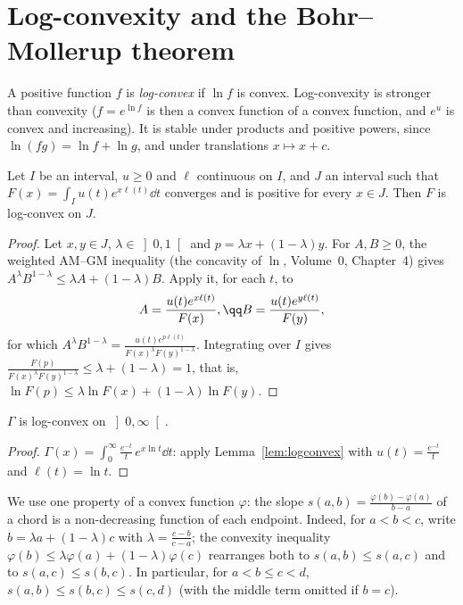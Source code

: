 \section{Log-convexity and the Bohr--Mollerup theorem}

A positive function $f$ is \emph{log-convex} if $\ln f$ is convex. Log-convexity is stronger than convexity
($f=e^{\ln f}$ is then a convex function of a convex function, and $e^u$ is convex and increasing). It is stable under
products and positive powers, since $\ln(fg)=\ln f+\ln g$, and under translations $x\mapsto x+c$.

\begin{lemma}\label{lem:logconvex}
Let $I$ be an interval, $u\ge0$ and $\ell$ continuous on $I$, and $J$ an interval such that $F(x)=\int_Iu(t)e^{x\ell(t)}\dd t$
converges and is positive for every $x\in J$. Then $F$ is log-convex on $J$.
\end{lemma}
\begin{proof}
Let $x,y\in J$, $\lambda\in\left]0,1\right[$ and $p=\lambda x+(1-\lambda)y$. For $A,B\ge0$, the weighted AM--GM inequality (the concavity
of $\ln$, Volume~0, Chapter~4) gives $A^\lambda B^{1-\lambda}\le\lambda A+(1-\lambda)B$. Apply it, for each $t$, to
\[
\begin{gathered}A=\frac{u(t)e^{x\ell(t)}}{F(x)},\qq B=\frac{u(t)e^{y\ell(t)}}{F(y)},\end{gathered}
\]
for which $A^\lambda B^{1-\lambda}=\frac{u(t)e^{p\ell(t)}}{F(x)^\lambda F(y)^{1-\lambda}}$. Integrating over $I$ gives
$\frac{F(p)}{F(x)^\lambda F(y)^{1-\lambda}}\le\lambda+(1-\lambda)=1$, that is, $\ln F(p)\le\lambda\ln F(x)+(1-\lambda)\ln F(y)$.
\end{proof}

\begin{corollary}\label{cor:gammalogconvex}
$\Gamma$ is log-convex on $\left]0,\infty\right[$.
\end{corollary}
\begin{proof}
$\Gamma(x)=\int_0^\infty\frac{e^{-t}}t\,e^{x\ln t}\dd t$: apply Lemma~\ref{lem:logconvex} with $u(t)=\frac{e^{-t}}t$ and $\ell(t)=\ln t$.
\end{proof}

We use one property of a convex function $\varphi$: the slope $s(a,b)=\frac{\varphi(b)-\varphi(a)}{b-a}$ of a chord is a non-decreasing
function of each endpoint. Indeed, for $a<b<c$, write $b=\lambda a+(1-\lambda)c$ with $\lambda=\frac{c-b}{c-a}$; the convexity inequality
$\varphi(b)\le\lambda\varphi(a)+(1-\lambda)\varphi(c)$ rearranges both to $s(a,b)\le s(a,c)$ and to $s(a,c)\le s(b,c)$. In particular, for
$a<b\le c<d$, $s(a,b)\le s(b,c)\le s(c,d)$ (with the middle term omitted if $b=c$).

